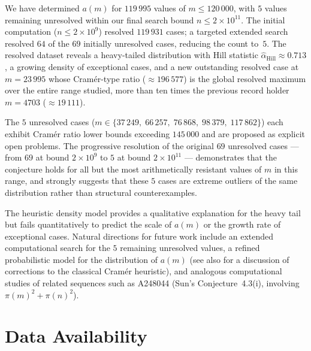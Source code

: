 \documentclass{amsart}
\theoremstyle{definition}
\theoremstyle{remark}
\numberwithin{equation}{section}
\begin{document}
We have determined $a(m)$ for $119\,995$ values of $m \leq 120\,000$,
with $5$ values remaining unresolved within our final search bound
$n \leq 2 \times 10^{11}$.
The initial computation ($n \leq 2 \times 10^9$) resolved $119\,931$
cases; a targeted extended search resolved $64$ of the
$69$ initially unresolved cases, reducing the count to~$5$.
The resolved dataset reveals a heavy-tailed distribution with Hill
statistic $\hat{\alpha}_{\mathrm{Hill}} \approx 0.713$, a growing
density of exceptional cases, and a new outstanding resolved case at
$m = 23\,995$ whose Cram\'er-type ratio ($\approx 196\,577$) is
the global resolved maximum over the entire range studied, more than
ten times the previous record holder $m = 4703$ ($\approx 19\,111$).

The $5$ unresolved cases ($m \in \{37\,249,\; 66\,257,\; 76\,868,\;
98\,379,\; 117\,862\}$) each exhibit Cram\'er ratio lower bounds
exceeding $145\,000$ and are proposed as explicit open problems.
The progressive resolution of the original $69$ unresolved cases
--- from $69$ at bound $2 \times 10^9$ to $5$ at bound
$2 \times 10^{11}$ --- demonstrates that the conjecture holds for
all but the most arithmetically resistant values of $m$ in this range,
and strongly suggests that these $5$ cases are extreme outliers of the
same distribution rather than structural counterexamples.

The heuristic density model provides a qualitative explanation for the
heavy tail but fails quantitatively to predict the scale of $a(m)$ or
the growth rate of exceptional cases.
Natural directions for future work include an extended computational
search for the $5$ remaining unresolved values, a refined probabilistic
model for the distribution of $a(m)$
(see also \cite{Granville1995} for a discussion of corrections to
the classical Cram\'er heuristic), and analogous computational studies
of related sequences such as A248044 (Sun's Conjecture~4.3(i),
involving $\pi(m)^2 + \pi(n)^2$).

\section*{Data Availability}
\label{sec:data}
\end{document}

